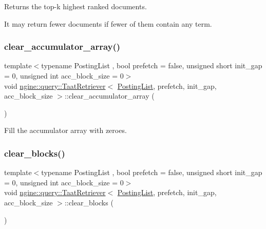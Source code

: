 Returns the top-\/k highest ranked documents.

It may return fewer documents if fewer of them contain any term. \mbox{\label{classngine_1_1query_1_1TaatRetriever_a06a032c0bbde9724e4bd7e82d82d8534}} 
\subsubsection{\texorpdfstring{clear\+\_\+accumulator\+\_\+array()}{clear\_accumulator\_array()}}
{\footnotesize\ttfamily template$<$typename Posting\+List , bool prefetch = false, unsigned short init\+\_\+gap = 0, unsigned int acc\+\_\+block\+\_\+size = 0$>$ \\
void \hyperlink{classngine_1_1query_1_1TaatRetriever}{ngine\+::query\+::\+Taat\+Retriever}$<$ \hyperlink{classngine_1_1PostingList}{Posting\+List}, prefetch, init\+\_\+gap, acc\+\_\+block\+\_\+size $>$\+::clear\+\_\+accumulator\+\_\+array (\begin{DoxyParamCaption}{ }\end{DoxyParamCaption})\hspace{0.3cm}{\ttfamily [inline]}}



Fill the accumulator array with zeroes. 

\mbox{\label{classngine_1_1query_1_1TaatRetriever_a817e3b8640ff2dc99614aa201774bb58}} 
\subsubsection{\texorpdfstring{clear\+\_\+blocks()}{clear\_blocks()}}
{\footnotesize\ttfamily template$<$typename Posting\+List , bool prefetch = false, unsigned short init\+\_\+gap = 0, unsigned int acc\+\_\+block\+\_\+size = 0$>$ \\
void \hyperlink{classngine_1_1query_1_1TaatRetriever}{ngine\+::query\+::\+Taat\+Retriever}$<$ \hyperlink{classngine_1_1PostingList}{Posting\+List}, prefetch, init\+\_\+gap, acc\+\_\+block\+\_\+size $>$\+::clear\+\_\+blocks (\begin{DoxyParamCaption}{ }\end{DoxyParamCaption})\hspace{0.3cm}{\ttfamily [inline]}}



